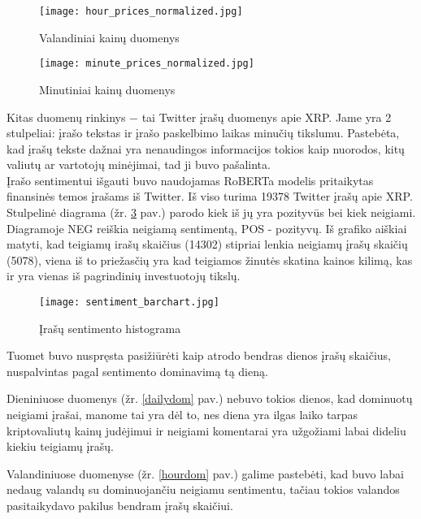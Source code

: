 \documentclass[12pt,a4paper]{article}
\begin{document}
\begin{figure}[!h]
\centering
\caption{Valandiniai kainų duomenys}
\label{hourprice}
\hspace*{-1cm}\texttt{[image: hour\_prices\_normalized.jpg]}
\end{figure}

\begin{figure}[!h]
\centering
\caption{Minutiniai kainų duomenys}
\label{minuteprice}
\hspace*{-1cm}\texttt{[image: minute\_prices\_normalized.jpg]}
\end{figure}

\newpage

Kitas duomenų rinkinys $-$ tai Twitter įrašų duomenys apie XRP.
Jame yra 2 stulpeliai: įrašo tekstas ir įrašo paskelbimo laikas minučių tikslumu.
Pastebėta, kad įrašų tekste dažnai yra nenaudingos informacijos tokios kaip nuorodos, kitų valiutų ar vartotojų minėjimai, tad ji buvo pašalinta. \\
Įrašo sentimentui išgauti buvo naudojamas RoBERTa modelis pritaikytas finansinės temos įrašams iš Twitter.
Iš viso turima 19378 Twitter įrašų apie XRP. Stulpelinė diagrama (žr. \ref{sentiment} pav.) parodo kiek iš jų yra pozityvūs bei kiek neigiami. Diagramoje NEG reiškia neigiamą sentimentą, POS - pozityvų. Iš grafiko aiškiai matyti, kad teigiamų irašų skaičius (14302) stipriai lenkia neigiamų įrašų skaičių (5078), viena iš to priežasčių yra kad teigiamos žinutės skatina kainos kilimą, kas ir yra vienas iš pagrindinių investuotojų tikslų.

\begin{figure}[!h]
\centering
\caption{Įrašų sentimento histograma}
\label{sentiment}
\hspace*{-1cm}\texttt{[image: sentiment\_barchart.jpg]}
\end{figure}
\newpage

Tuomet buvo nuspręsta pasižiūrėti kaip atrodo bendras dienos įrašų skaičius, nuspalvintas pagal sentimento dominavimą tą dieną.

Dieniniuose duomenys (žr. \ref{dailydom} pav.) nebuvo tokios dienos, kad dominuotų neigiami įrašai, manome tai yra dėl to, nes diena yra ilgas laiko tarpas kriptovaliutų kainų judėjimui ir neigiami komentarai yra užgožiami labai dideliu kiekiu teigiamų įrašų.

Valandiniuose duomenyse (žr. \ref{hourdom} pav.) galime pastebėti, kad buvo labai nedaug valandų su dominuojančiu neigiamu sentimentu, tačiau tokios valandos pasitaikydavo pakilus bendram įrašų skaičiui.
\end{document}
